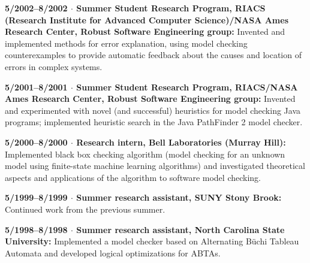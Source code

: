 \documentclass[ComputerScience]{vita}
\begin{document}
\begin{vita}
\begin{Experience}
  \item {\bf 5/2002--8/2002 $\cdot$  Summer Student Research Program, RIACS (Research Institute for Advanced Computer Science)/NASA Ames Research Center, Robust Software Engineering group:}  Invented and implemented methods for error explanation, using model checking counterexamples to provide automatic feedback about the causes and location of errors in complex systems.

  \item {\bf 5/2001--8/2001 $\cdot$  Summer Student Research Program, RIACS/NASA Ames Research Center, Robust Software Engineering group:}  Invented and experimented with novel (and successful) heuristics for model checking Java programs; implemented heuristic search in the Java PathFinder 2 model checker.

  \item {\bf 5/2000--8/2000 $\cdot$  Research intern, Bell Laboratories (Murray Hill):}  Implemented black box checking algorithm (model checking for an unknown model using finite-state machine learning algorithms) and investigated theoretical aspects and applications of the algorithm to software model checking.

  \item {\bf 5/1999--8/1999 $\cdot$ Summer research assistant, SUNY Stony Brook:}  Continued work from the previous summer.

  \item {\bf 5/1998--8/1998 $\cdot$ Summer research assistant, North Carolina State University:}   Implemented a model checker based on Alternating B\"uchi Tableau Automata and developed logical optimizations for ABTAs.

\end{Experience}


\end{vita}
\end{document}
